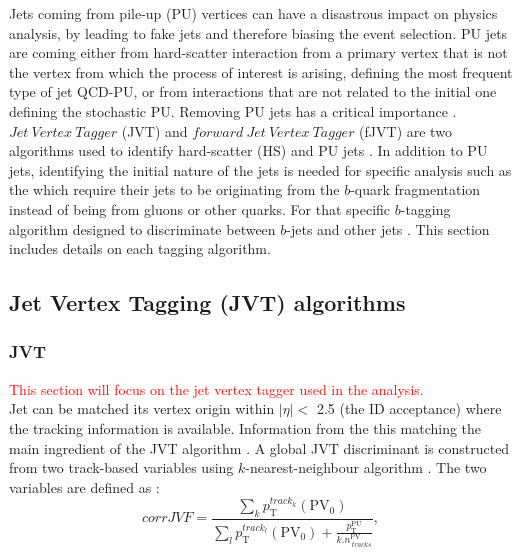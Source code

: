 Jets coming from pile-up (PU) vertices can have a disastrous impact on physics analysis, by leading to fake jets and therefore biasing the event selection. PU jets are coming either from hard-scatter interaction from a primary vertex that is not the vertex from which the process of interest is arising, defining the most frequent type of jet QCD-PU, or from interactions that are not related to the initial one defining the stochastic PU. Removing PU jets has a critical importance \cite{Tagging_2013, Tagging_2014}. $Jet\ Vertex\ Tagger$ (JVT) and $forward \ Jet \ Vertex\ Tagger$ (fJVT) are two algorithms used to identify hard-scatter (HS) and PU jets \cite{JVT_2014, fJVT}. In addition to PU jets, identifying the initial nature of the jets is needed for specific analysis such as the \HHyybb which require their jets to be originating from the $b$-quark fragmentation instead of being from gluons or other quarks. For that specific $b$-tagging algorithm designed to discriminate between $b$-jets and other jets \cite{Light_Quark_Tagger}. This section includes details on each tagging algorithm. 
\subsection{Jet Vertex Tagging (JVT) algorithms}
\label{Jet:Tag:JVT}
\subsubsection{JVT}
\label{Jet:Tag:JVT:JVT}
\textcolor{red}{This section will focus on the jet vertex tagger used in the analysis. \\}
Jet can be matched its vertex origin within $|\eta|<$ 2.5 (the ID acceptance) where the tracking information is available. Information from the this matching the main ingredient of the JVT algorithm \cite{JVT_Perf}. A global JVT discriminant is constructed from two track-based variables using $k$-nearest-neighbour algorithm \cite{kNN}. The two variables are defined as : 
\begin{equation}
    corrJVF=\frac{\sum_{k} p_{\mathrm{T}}^{ {track
    }_{k}}\left(\mathrm{PV}_{0}\right)}{\sum_{l} p_{\mathrm{T}}^{{track
    }_{l}}\left(\mathrm{PV}_{0}\right)+\frac{p_{\mathrm{T}}^{\mathrm{PU}}}{k . n_{\ {tracks }}^{\mathrm{PV}}}},
\end{equation}

